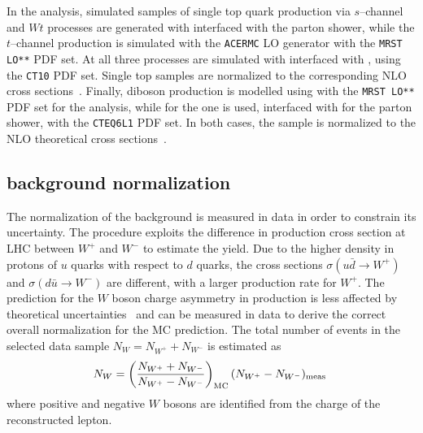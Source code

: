 In the \seventev{} analysis, simulated samples of single top quark
production via $s$--channel and $Wt$ processes are generated with
\mcatnlo{} interfaced with the \herwig{} parton shower, while the
$t$--channel production is simulated with the {\tt ACERMC} LO
generator with the {\tt MRST LO**} PDF set.
At \eighttev{} all three processes are simulated with \powheg{}
interfaced with \pythia{}, using the {\tt CT10} PDF set.
Single top samples are normalized to the corresponding NLO cross
sections~\cite{stschan,sttchan,stwt}. 
Finally, diboson production is modelled using \herwig{} with
the {\tt MRST LO**} PDF set for the \seventev{} analysis, while for
the \eighttev{} one \alpgen{} is used, interfaced with \herwig{} for
the parton shower, with the {\tt CTEQ6L1} PDF set. In both cases, the
sample is normalized to the NLO theoretical cross
sections~\cite{dibosonxs}.

\subsection{\wjets{} background normalization}
\label{sec:wjets}

The normalization of the \wjets{} background is measured in data in
order to constrain its uncertainty.
The procedure exploits the difference in production cross section at LHC
between $W^+$ and $W^-$ to estimate the \wjets{} yield.
Due to the higher density in protons of $u$ quarks with respect to $d$ quarks,
the cross sections $\sigma(u\bar{d}\to W^+)$ and $\sigma(d\bar{u}\to
W^-)$ are different, with a larger production rate for $W^+$. The
prediction for the $W$ boson charge asymmetry in \wjets{} production is less
affected by theoretical uncertainties~\cite{wasym} and can be measured
in data to derive the correct overall normalization for the MC prediction.
The total number of \wjets{} events in the selected data sample
$N_{W}=N_{W^+}+N_{W^-}$ is estimated as
\begin{equation}
N_{W} = \left(\frac{N_{W^+}+N_{W^-}}{N_{W^+}-N_{W^-}}\right )_{\rm
  MC}(N_{W^+}-N_{W^-})_{\rm meas}
\phantom{,}
\label{eq:nw}
\end{equation}
where positive and negative $W$ bosons are identified from the
charge of the reconstructed lepton. 

